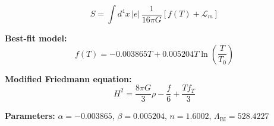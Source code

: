 
\begin{equation}
  S = \int d^4x \, |e| \, \frac{1}{16\pi G} \left[ f(T) + \mathcal{L}_m \right]
\end{equation}

\textbf{Best-fit model:}
\begin{equation}
  f(T) = -0.003865 T + 0.005204 T \ln\!\left(\frac{T}{T_0}\right)
\end{equation}

\textbf{Modified Friedmann equation:}
\begin{equation}
  H^2 = \frac{8\pi G}{3} \rho - \frac{f}{6} + \frac{T f_T}{3}
\end{equation}

\textbf{Parameters:}
$\alpha = -0.003865$, \quad
$\beta = 0.005204$, \quad
$n = 1.6002$, \quad
$\Lambda_{\text{BI}} = 528.4227$